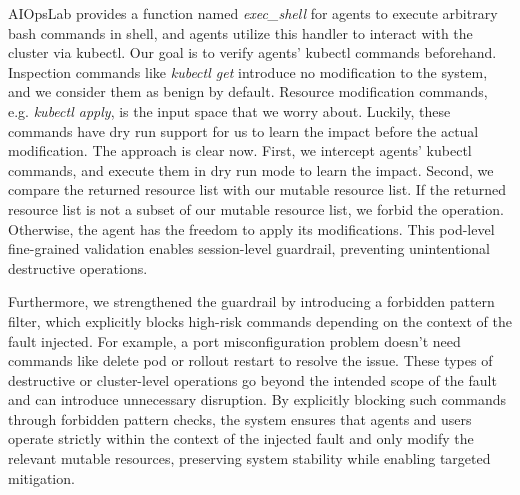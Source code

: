 AIOpsLab provides a function named \textit{exec\_shell} for agents to execute arbitrary bash commands in shell, and agents utilize this handler to interact with the cluster via kubectl. Our goal is to verify agents' kubectl commands beforehand. Inspection commands like \textit{kubectl get} introduce no modification to the system, and we consider them as benign by default. Resource modification commands, e.g. \textit{kubectl apply}, is the input space that we worry about. Luckily, these commands have dry run support for us to learn the impact before the actual modification. The approach is clear now. First, we intercept agents' kubectl commands, and execute them in dry run mode to learn the impact. Second, we compare the returned resource list with our mutable resource list. If the returned resource list is not a subset of our mutable resource list, we forbid the operation. Otherwise, the agent has the freedom to apply its modifications. This pod-level fine-grained validation enables session-level guardrail, preventing unintentional destructive operations.



Furthermore, we strengthened the guardrail by introducing a forbidden pattern filter, which explicitly blocks high-risk commands depending on the context of the fault injected. For example, a port misconfiguration problem doesn't need commands like delete pod or rollout restart to resolve the issue. These types of destructive or cluster-level operations go beyond the intended scope of the fault and can introduce unnecessary disruption. By explicitly blocking such commands through forbidden pattern checks, the system ensures that agents and users operate strictly within the context of the injected fault and only modify the relevant mutable resources, preserving system stability while enabling targeted mitigation.
